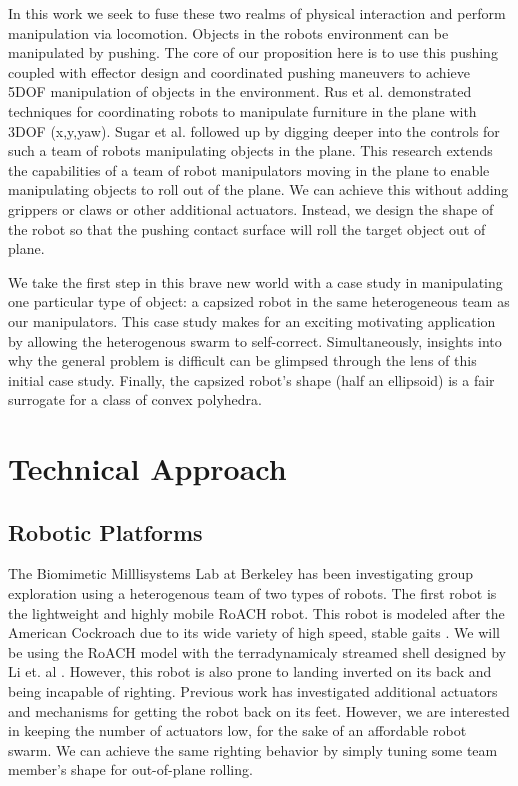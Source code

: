 \documentclass[runningheads,a4paper]{llncs}
\begin{document}
In this work we seek to fuse these two realms of physical interaction and perform manipulation via locomotion.
Objects in the robots environment can be manipulated by pushing.
The core of our proposition here is to use this pushing coupled with effector design and coordinated pushing maneuvers to achieve 5DOF manipulation of objects in the environment.
Rus et al.\cite{rus1995moving} demonstrated techniques for coordinating robots to manipulate furniture in the plane with 3DOF (x,y,yaw).
Sugar et al. \cite{sugar2002control} followed up by digging deeper into the controls for such a team of robots manipulating objects in the plane.
This research extends the capabilities of a team of robot manipulators moving in the plane to enable manipulating objects to roll out of the plane.
We can achieve this without adding grippers or claws or other additional actuators.
Instead, we design the shape of the robot so that the pushing contact surface will roll the target object out of plane.

We take the first step in this brave new world with a case study in manipulating one particular type of object: a capsized robot in the same heterogeneous team as our manipulators.
This case study makes for an exciting motivating application by allowing the heterogenous swarm to self-correct.
Simultaneously, insights into why the general problem is difficult can be glimpsed through the lens of this initial case study.
Finally, the capsized robot's shape (half an ellipsoid) is a fair surrogate for a class of convex polyhedra.

\clearpage
\section{Technical Approach}
\subsection{Robotic Platforms}
The Biomimetic Milllisystems Lab at Berkeley has been investigating group exploration using a heterogenous team of two types of robots.
The first robot is the lightweight and highly mobile RoACH robot.
This robot is modeled after the American Cockroach due to its wide variety of high speed, stable gaits \cite{RoACH}.
We will be using the RoACH model with the terradynamicaly streamed shell designed by Li et. al \cite{li2015terradynamically}.
However, this robot is also prone to landing inverted on its back and being incapable of righting.
Previous work has investigated additional actuators and mechanisms for getting the robot back on its feet.
However, we are interested in keeping the number of actuators low, for the sake of an affordable robot swarm.
We can achieve the same righting behavior by simply tuning some team member's shape for out-of-plane rolling.
\end{document}
